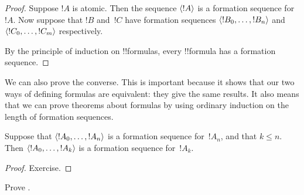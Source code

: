 \documentclass[../../../include/open-logic-section]{subfiles}
\begin{document}
\begin{proof}
Suppose $!A$ is atomic. Then the sequence $\langle !A \rangle$ is a
formation sequence for~$!A$.
%
Now suppose that $!B$ and~$!C$ have formation sequences
$\langle !B_0,\dotsc,!B_n \rangle$ and $\langle !C_0,\dotsc,!C_m \rangle$
respectively.
%
\begin{enumerate}
\end{enumerate}
By the principle of induction on !!{formula}s,
every !!{formula} has a formation sequence.
\end{proof}

We can also prove the converse. This is important because it shows
that our two ways of defining formulas are equivalent: they give
the same results. It also means that we can prove theorems about
formulas by using ordinary induction on the length of formation
sequences.

\begin{lem}
Suppose that $\langle !A_0,\dotsc,!A_n \rangle$ is a formation sequence
for~$!A_n$, and that $k \leq n$. Then $\langle !A_0,\dotsc,!A_k \rangle$
is a formation sequence for~$!A_k$.
\end{lem}

\begin{proof}
Exercise.
\end{proof}

\begin{prob}
Prove .
\end{prob}
\end{document}

